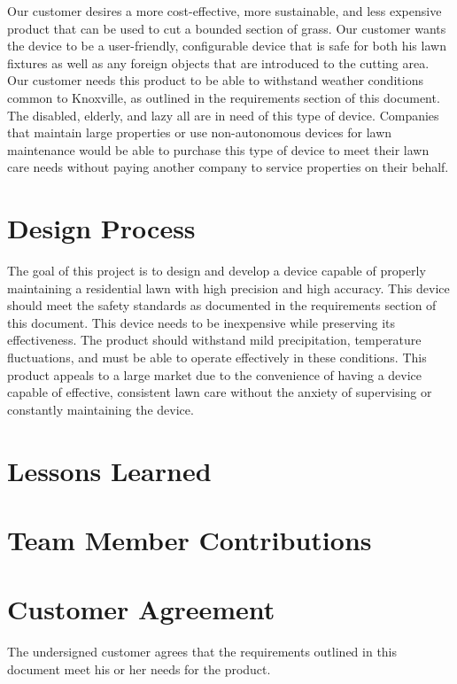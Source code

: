 \documentclass[12pt,letterpaper]{article}
\begin{document}
Our customer desires a more cost-effective, more sustainable, and less expensive product that can be used to cut a bounded section of grass. Our customer wants the device to be a user-friendly, configurable device that is safe for both his lawn fixtures as well as any foreign objects that are introduced to the cutting area. Our customer needs this product to be able to withstand weather conditions common to Knoxville, as outlined in the requirements section of this document. The disabled, elderly, and lazy all are in need of this type of device. Companies that maintain large properties or use non-autonomous devices for lawn maintenance would be able to purchase this type of device to meet their lawn care needs without paying another company to service properties on their behalf. 

\section{Design Process}

The goal of this project is to design and develop a device capable of properly maintaining a residential lawn with high precision and high accuracy. This device should meet the safety standards as documented in the requirements section of this document. This device needs to be inexpensive while preserving its effectiveness. The product should withstand mild precipitation, temperature fluctuations, and must be able to operate effectively in these conditions. This product appeals to a large market due to the convenience of having a device capable of effective, consistent lawn care without the anxiety of supervising or constantly maintaining the device. 

\section{Lessons Learned}

\section{Team Member Contributions}

\newpage
\section{Customer Agreement}

The undersigned customer agrees that the requirements outlined in this document meet his or her needs for the product.

\end{document}

